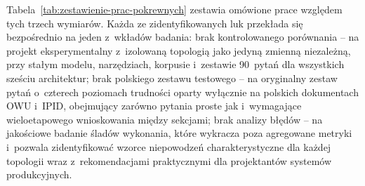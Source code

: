 Tabela~\ref{tab:zestawienie-prac-pokrewnych} zestawia omówione prace względem
tych trzech wymiarów. Każda ze zidentyfikowanych luk przekłada się bezpośrednio
na jeden z~wkładów badania: brak kontrolowanego porównania -- na projekt
eksperymentalny z~izolowaną topologią jako jedyną zmienną niezależną, przy
stałym modelu, narzędziach, korpusie i~zestawie 90~pytań dla wszystkich sześciu
architektur; brak polskiego zestawu testowego -- na oryginalny zestaw pytań
o~czterech poziomach trudności oparty wyłącznie na polskich dokumentach OWU
i~IPID, obejmujący zarówno pytania proste jak i~wymagające wieloetapowego
wnioskowania między sekcjami; brak analizy błędów -- na jakościowe badanie
śladów wykonania, które wykracza poza agregowane metryki i~pozwala
zidentyfikować wzorce niepowodzeń charakterystyczne dla każdej topologii wraz
z~rekomendacjami praktycznymi dla projektantów systemów produkcyjnych.

